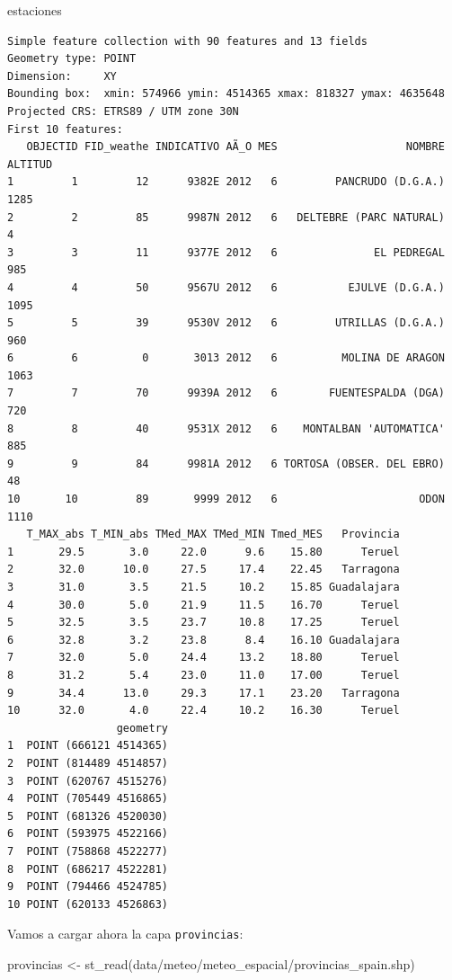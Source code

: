 \documentclass[
  letterpaper,
  DIV=11,
  numbers=noendperiod]{scrreprt}
\newenvironment{Shaded}{\begin{snugshade}}{\end{snugshade}}
\newcommand{\FunctionTok}[1]{\textcolor[rgb]{0.28,0.35,0.67}{#1}}
\newcommand{\NormalTok}[1]{\textcolor[rgb]{0.00,0.23,0.31}{#1}}
\newcommand{\OtherTok}[1]{\textcolor[rgb]{0.00,0.23,0.31}{#1}}
\newcommand{\StringTok}[1]{\textcolor[rgb]{0.13,0.47,0.30}{#1}}
\begin{document}
\begin{Shaded}
\begin{Highlighting}[]
\NormalTok{estaciones}
\end{Highlighting}
\end{Shaded}

\begin{verbatim}
Simple feature collection with 90 features and 13 fields
Geometry type: POINT
Dimension:     XY
Bounding box:  xmin: 574966 ymin: 4514365 xmax: 818327 ymax: 4635648
Projected CRS: ETRS89 / UTM zone 30N
First 10 features:
   OBJECTID FID_weathe INDICATIVO AÃ_O MES                    NOMBRE ALTITUD
1         1         12      9382E 2012   6         PANCRUDO (D.G.A.)    1285
2         2         85      9987N 2012   6   DELTEBRE (PARC NATURAL)       4
3         3         11      9377E 2012   6               EL PEDREGAL     985
4         4         50      9567U 2012   6           EJULVE (D.G.A.)    1095
5         5         39      9530V 2012   6         UTRILLAS (D.G.A.)     960
6         6          0       3013 2012   6          MOLINA DE ARAGON    1063
7         7         70      9939A 2012   6        FUENTESPALDA (DGA)     720
8         8         40      9531X 2012   6    MONTALBAN 'AUTOMATICA'     885
9         9         84      9981A 2012   6 TORTOSA (OBSER. DEL EBRO)      48
10       10         89       9999 2012   6                      ODON    1110
   T_MAX_abs T_MIN_abs TMed_MAX TMed_MIN Tmed_MES   Provincia
1       29.5       3.0     22.0      9.6    15.80      Teruel
2       32.0      10.0     27.5     17.4    22.45   Tarragona
3       31.0       3.5     21.5     10.2    15.85 Guadalajara
4       30.0       5.0     21.9     11.5    16.70      Teruel
5       32.5       3.5     23.7     10.8    17.25      Teruel
6       32.8       3.2     23.8      8.4    16.10 Guadalajara
7       32.0       5.0     24.4     13.2    18.80      Teruel
8       31.2       5.4     23.0     11.0    17.00      Teruel
9       34.4      13.0     29.3     17.1    23.20   Tarragona
10      32.0       4.0     22.4     10.2    16.30      Teruel
                 geometry
1  POINT (666121 4514365)
2  POINT (814489 4514857)
3  POINT (620767 4515276)
4  POINT (705449 4516865)
5  POINT (681326 4520030)
6  POINT (593975 4522166)
7  POINT (758868 4522277)
8  POINT (686217 4522281)
9  POINT (794466 4524785)
10 POINT (620133 4526863)
\end{verbatim}

Vamos a cargar ahora la capa \texttt{provincias}:

\begin{Shaded}
\begin{Highlighting}[]
\NormalTok{provincias }\OtherTok{\textless{}{-}} \FunctionTok{st\_read}\NormalTok{(}\StringTok{\textquotesingle{}data/meteo/meteo\_espacial/provincias\_spain.shp\textquotesingle{}}\NormalTok{) }
\end{Highlighting}
\end{Shaded}
\end{document}
